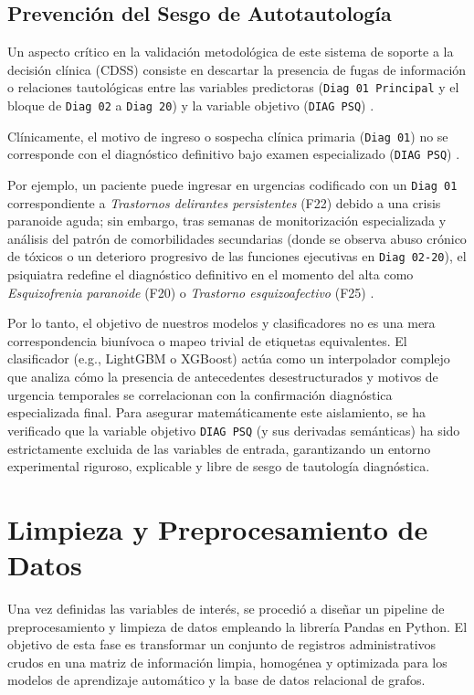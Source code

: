 \documentclass[12pt,a4paper,onecolumn,oneside]{report}
\begin{document}
\subsection{Prevención del Sesgo de Autotautología}

Un aspecto crítico en la validación metodológica de este sistema de soporte a la decisión clínica (CDSS) consiste en descartar la presencia de fugas de información o relaciones tautológicas entre las variables predictoras (\texttt{Diag 01 Principal} y el bloque de \texttt{Diag 02} a \texttt{Diag 20}) y la variable objetivo (\texttt{DIAG PSQ}) \cite{hansen2025predicting}.

Clínicamente, el motivo de ingreso o sospecha clínica primaria (\texttt{Diag 01}) no se corresponde con el diagnóstico definitivo bajo examen especializado (\texttt{DIAG PSQ}) \cite{saboori2025predictive}. 

Por ejemplo, un paciente puede ingresar en urgencias codificado con un \texttt{Diag 01} correspondiente a \textit{Trastornos delirantes persistentes} (F22) debido a una crisis paranoide aguda; sin embargo, tras semanas de monitorización especializada y análisis del patrón de comorbilidades secundarias (donde se observa abuso crónico de tóxicos o un deterioro progresivo de las funciones ejecutivas en \texttt{Diag 02-20}), el psiquiatra redefine el diagnóstico definitivo en el momento del alta como \textit{Esquizofrenia paranoide} (F20) o \textit{Trastorno esquizoafectivo} (F25) \cite{saboori2025predictive, hansen2025predicting}.

Por lo tanto, el objetivo de nuestros modelos y clasificadores no es una mera correspondencia biunívoca o mapeo trivial de etiquetas equivalentes. El clasificador (e.g., LightGBM o XGBoost) actúa como un interpolador complejo que analiza cómo la presencia de antecedentes desestructurados y motivos de urgencia temporales se correlacionan con la confirmación diagnóstica especializada final. Para asegurar matemáticamente este aislamiento, se ha verificado que la variable objetivo \texttt{DIAG PSQ} (y sus derivadas semánticas) ha sido estrictamente excluida de las variables de entrada, garantizando un entorno experimental riguroso, explicable y libre de sesgo de tautología diagnóstica.

\section{Limpieza y Preprocesamiento de Datos}

Una vez definidas las variables de interés, se procedió a diseñar un pipeline de preprocesamiento y limpieza de datos empleando la librería Pandas en Python. El objetivo de esta fase es transformar un conjunto de registros administrativos crudos en una matriz de información limpia, homogénea y optimizada para los modelos de aprendizaje automático y la base de datos relacional de grafos. 
\end{document}
